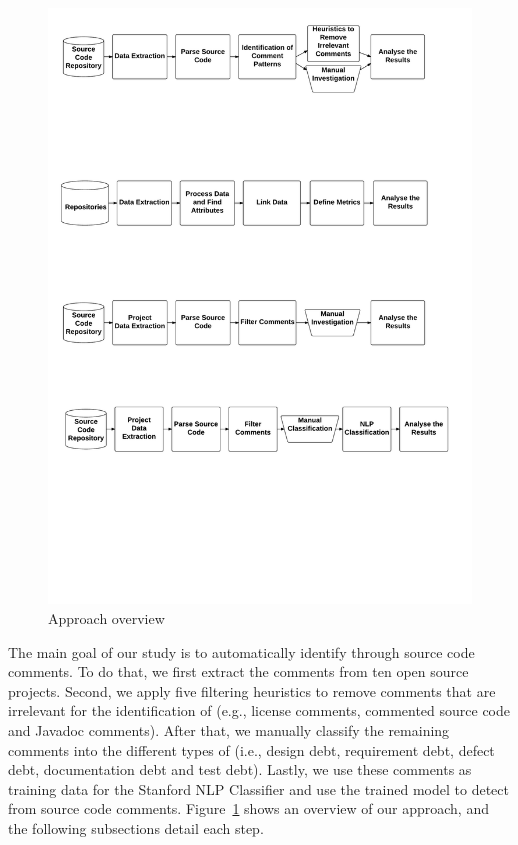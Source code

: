 \begin{figure}[thb!]
  \centering
  \includegraphics[width=1\textwidth]{figures/approach.pdf}
  \caption{Approach overview}
  \label{fig:approach}
  \vspace{-4mm}
\end{figure}

The main goal of our study is to automatically identify \SATD through source code comments. To do that, we first extract the comments from ten open source projects. Second, we apply five filtering heuristics to remove comments that are irrelevant for the identification of \SATD  (e.g., license comments, commented source code and Javadoc comments). After that, we manually classify the remaining comments into the different types of \SATD (i.e., design debt, requirement debt, defect debt, documentation debt and test debt). Lastly, we use these comments as training data for the Stanford NLP Classifier and use the trained model to detect \SATD from source code comments. Figure~\ref{fig:approach} shows an overview of our approach, and the following subsections detail each step.

